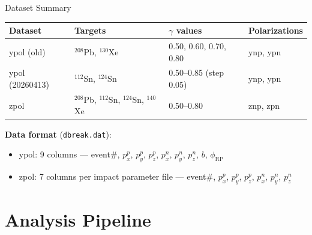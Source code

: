 \documentclass[aspectratio=169,11pt]{beamer}
\begin{document}
\begin{frame}{Dataset Summary}
\begin{table}[h]
\centering
\small
\begin{tabular}{llll}
\toprule
\textbf{Dataset} & \textbf{Targets} & \textbf{$\gamma$ values} & \textbf{Polarizations} \\
\midrule
ypol (old)      & $^{208}$Pb, $^{130}$Xe & 0.50, 0.60, 0.70, 0.80 & ynp, ypn \\
ypol (20260413) & $^{112}$Sn, $^{124}$Sn & 0.50--0.85 (step 0.05) & ynp, ypn \\
zpol            & $^{208}$Pb, $^{112}$Sn, $^{124}$Sn, $^{140}$Xe & 0.50--0.80 & znp, zpn \\
\bottomrule
\end{tabular}
\end{table}

\vspace{0.3cm}
\textbf{Data format} (\texttt{dbreak.dat}):
\begin{itemize}
  \item ypol: 9 columns --- event\#, $p_x^p$, $p_y^p$, $p_z^p$, $p_x^n$, $p_y^n$, $p_z^n$, $b$, $\phi_\text{RP}$
  \item zpol: 7 columns per impact parameter file --- event\#, $p_x^p$, $p_y^p$, $p_z^p$, $p_x^n$, $p_y^n$, $p_z^n$
\end{itemize}
\end{frame}

\section{Analysis Pipeline}
\end{document}
